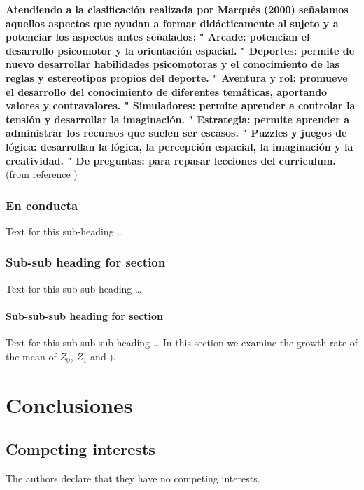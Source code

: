 \documentclass{bmcart}
\begin{document}
{\textbf{Atendiendo a la clasificación realizada por Marqués (2000) señalamos aquellos aspectos que ayudan a formar didácticamente al sujeto y a potenciar los aspectos antes señalados:}
\newline
\newline
\textbf{
" Arcade: potencian el desarrollo psicomotor y la orientación espacial.
" Deportes: permite de nuevo desarrollar habilidades psicomotoras y el conocimiento de las reglas y estereotipos propios del deporte.
" Aventura y rol: promueve el desarrollo del conocimiento de diferentes temáticas, aportando valores y contravalores.
" Simuladores: permite aprender a controlar la tensión y desarrollar la imaginación.
" Estrategia: permite aprender a administrar los recursos que suelen ser escasos.
" Puzzles y juegos de lógica: desarrollan la lógica, la percepción espacial, la imaginación y la creatividad.
" De preguntas: para repasar lecciones del curriculum.}
(from reference \cite{diaz2005videojuegos})

\subsubsection*{En conducta}
Text for this sub-heading \ldots
\subsubsection*{Sub-sub heading for section}
Text for this sub-sub-heading \ldots
\paragraph*{Sub-sub-sub heading for section}
Text for this sub-sub-sub-heading \ldots
In this section we examine the growth rate of the mean of $Z_0$, $Z_1$ and  \cite{koon,khar,zvai,xjon,marg}).

\section*{Conclusiones}


\begin{backmatter}

\section*{Competing interests}
  The authors declare that they have no competing interests.


\end{backmatter}}
\end{document}
